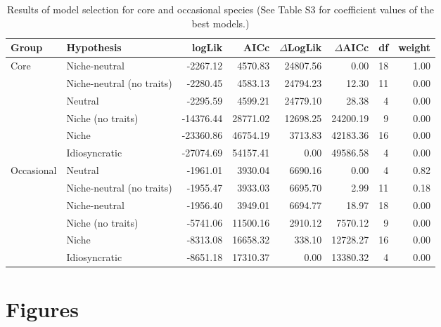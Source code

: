 \documentclass[12pt]{article}
\begin{document}
  \begin{table}[!ht]
  \caption{Results of model selection for core and occasional species (See Table S3 for coefficient values of the best models.)}\label{aic}
\centering
\begin{tabular}{llrrrrrr}
  \hline
 \textbf{Group} & \textbf{Hypothesis} & \textbf{logLik} & \textbf{AICc} & \textbf{{$\Delta$}LogLik} & \textbf{{$\Delta$}AICc} & \textbf{df} & \textbf{weight} \\ 
  \hline
  \multirow{6}{*}{Core} & Niche-neutral & -2267.12 & 4570.83 & 24807.56 & 0.00 &  18 & 1.00 \\ 
 & Niche-neutral (no traits) & -2280.45 & 4583.13 & 24794.23 & 12.30 &  11 & 0.00 \\ 
 & Neutral & -2295.59 & 4599.21 & 24779.10 & 28.38 &   4 & 0.00 \\ 
 & Niche (no traits) & -14376.44 & 28771.02 & 12698.25 & 24200.19 &   9 & 0.00 \\ 
 & Niche & -23360.86 & 46754.19 & 3713.83 & 42183.36 &  16 & 0.00 \\ 
 & Idiosyncratic & -27074.69 & 54157.41 & 0.00 & 49586.58 &   4 & 0.00 \\ 
   \cmidrule(lr){1-8}	
\multirow{6}{*}{Occasional}& Neutral & -1961.01 & 3930.04 & 6690.16 & 0.00 &   4 & 0.82 \\ 
 & Niche-neutral (no traits) & -1955.47 & 3933.03 & 6695.70 & 2.99 &  11 & 0.18 \\ 
 & Niche-neutral & -1956.40 & 3949.01 & 6694.77 & 18.97 &  18 & 0.00 \\ 
 & Niche (no traits) & -5741.06 & 11500.16 & 2910.12 & 7570.12 &   9 & 0.00 \\ 
 & Niche & -8313.08 & 16658.32 & 338.10 & 12728.27 &  16 & 0.00 \\ 
 & Idiosyncratic & -8651.18 & 17310.37 & 0.00 & 13380.32 &   4 & 0.00 \\ 
  \hline
\end{tabular}
\end{table}


\clearpage

\section*{Figures}
\end{document}
